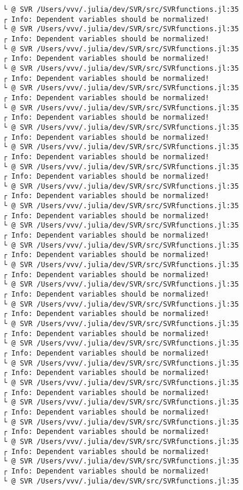 \documentclass[11pt]{article}
\begin{document}
\begin{Verbatim}[commandchars=\\\{\}]
└ @ SVR /Users/vvv/.julia/dev/SVR/src/SVRfunctions.jl:35
┌ Info: Dependent variables should be normalized!
└ @ SVR /Users/vvv/.julia/dev/SVR/src/SVRfunctions.jl:35
┌ Info: Dependent variables should be normalized!
└ @ SVR /Users/vvv/.julia/dev/SVR/src/SVRfunctions.jl:35
┌ Info: Dependent variables should be normalized!
└ @ SVR /Users/vvv/.julia/dev/SVR/src/SVRfunctions.jl:35
┌ Info: Dependent variables should be normalized!
└ @ SVR /Users/vvv/.julia/dev/SVR/src/SVRfunctions.jl:35
┌ Info: Dependent variables should be normalized!
└ @ SVR /Users/vvv/.julia/dev/SVR/src/SVRfunctions.jl:35
┌ Info: Dependent variables should be normalized!
└ @ SVR /Users/vvv/.julia/dev/SVR/src/SVRfunctions.jl:35
┌ Info: Dependent variables should be normalized!
└ @ SVR /Users/vvv/.julia/dev/SVR/src/SVRfunctions.jl:35
┌ Info: Dependent variables should be normalized!
└ @ SVR /Users/vvv/.julia/dev/SVR/src/SVRfunctions.jl:35
┌ Info: Dependent variables should be normalized!
└ @ SVR /Users/vvv/.julia/dev/SVR/src/SVRfunctions.jl:35
┌ Info: Dependent variables should be normalized!
└ @ SVR /Users/vvv/.julia/dev/SVR/src/SVRfunctions.jl:35
┌ Info: Dependent variables should be normalized!
└ @ SVR /Users/vvv/.julia/dev/SVR/src/SVRfunctions.jl:35
┌ Info: Dependent variables should be normalized!
└ @ SVR /Users/vvv/.julia/dev/SVR/src/SVRfunctions.jl:35
┌ Info: Dependent variables should be normalized!
└ @ SVR /Users/vvv/.julia/dev/SVR/src/SVRfunctions.jl:35
┌ Info: Dependent variables should be normalized!
└ @ SVR /Users/vvv/.julia/dev/SVR/src/SVRfunctions.jl:35
┌ Info: Dependent variables should be normalized!
└ @ SVR /Users/vvv/.julia/dev/SVR/src/SVRfunctions.jl:35
┌ Info: Dependent variables should be normalized!
└ @ SVR /Users/vvv/.julia/dev/SVR/src/SVRfunctions.jl:35
┌ Info: Dependent variables should be normalized!
└ @ SVR /Users/vvv/.julia/dev/SVR/src/SVRfunctions.jl:35
┌ Info: Dependent variables should be normalized!
└ @ SVR /Users/vvv/.julia/dev/SVR/src/SVRfunctions.jl:35
┌ Info: Dependent variables should be normalized!
└ @ SVR /Users/vvv/.julia/dev/SVR/src/SVRfunctions.jl:35
┌ Info: Dependent variables should be normalized!
└ @ SVR /Users/vvv/.julia/dev/SVR/src/SVRfunctions.jl:35
┌ Info: Dependent variables should be normalized!
└ @ SVR /Users/vvv/.julia/dev/SVR/src/SVRfunctions.jl:35
┌ Info: Dependent variables should be normalized!
└ @ SVR /Users/vvv/.julia/dev/SVR/src/SVRfunctions.jl:35
┌ Info: Dependent variables should be normalized!
└ @ SVR /Users/vvv/.julia/dev/SVR/src/SVRfunctions.jl:35
┌ Info: Dependent variables should be normalized!
└ @ SVR /Users/vvv/.julia/dev/SVR/src/SVRfunctions.jl:35

\end{Verbatim}
\end{document}
